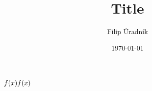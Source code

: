 \documentclass{article}
\title{Title}
\author{Filip Úradník}
\date{\today}
\begin{document}
\maketitle

$ \fce{f}{x} f(x) $
\end{document}
